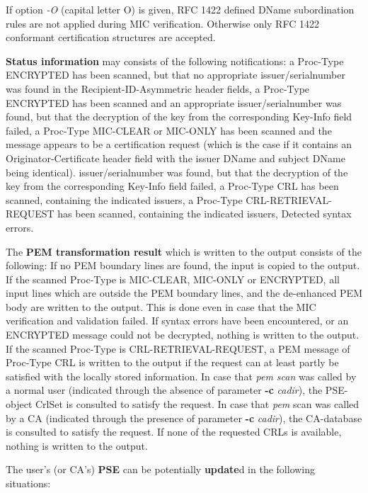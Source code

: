If option {\em -O} (capital letter O) is given, RFC 1422 defined DName subordination rules
are not applied during MIC verification. Otherwise only RFC 1422 conformant certification
structures are accepted. 

{\bf Status information} may consists of the following notifications:
\bi
\m a Proc-Type ENCRYPTED has been scanned, but that no appropriate 
   issuer/serialnumber was found in the Recipient-ID-Asymmetric header fields,
\m a Proc-Type ENCRYPTED has been scanned and an appropriate 
   issuer/serialnumber was found, but that the decryption of the key from the corresponding 
   Key-Info field failed,
\m a Proc-Type MIC-CLEAR or MIC-ONLY has been scanned and the message appears to be a
   certification request (which is the case if it contains an Originator-Certificate
   header field with the issuer DName and subject DName being identical). 
   issuer/serialnumber was found, but that the decryption of the key from the corresponding 
   Key-Info field failed,
\m a Proc-Type CRL has been scanned, containing the indicated issuers,
\m a Proc-Type CRL-RETRIEVAL-REQUEST has been scanned, containing the indicated issuers,
\m Detected syntax errors.
\ei

The {\bf PEM transformation result} which is written to the output consists of the
following:
\bi
\m If no PEM boundary lines are found, the input is copied to the output.
\m If the scanned Proc-Type is MIC-CLEAR, MIC-ONLY or ENCRYPTED, all input lines which are 
   outside the PEM boundary lines, and the de-enhanced PEM body are written to the output. 
   This is done even in case that the MIC verification and validation failed. If
   syntax errors have been encountered, or an ENCRYPTED message could not be decrypted,
   nothing is written to the output.
\m If the scanned Proc-Type is CRL-RETRIEVAL-REQUEST, a PEM message of Proc-Type CRL is written
   to the output if the request can at least partly be satisfied with the locally stored 
   information. In case that {\em pem scan} was called by a normal user (indicated through the
   absence of parameter {\bf -c} {\em cadir}), the PSE-object CrlSet is consulted to
   satisfy the request. In case that {\em pem} scan was called by a CA (indicated through the
   presence of parameter {\bf -c} {\em cadir}), the CA-database is consulted to
   satisfy the request. If none of the requested CRLs is available, nothing is written
   to the output.
\ei

The user's (or CA's) {\bf PSE} can be potentially {\bf update}d in the following situations:

